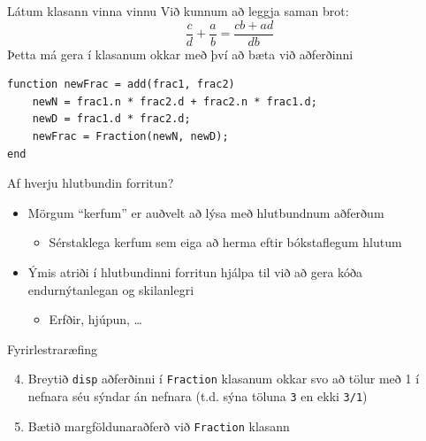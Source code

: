 \documentclass{beamer}
\begin{document}
\begin{frame}[fragile]{Látum klasann vinna vinnu}
\vspace{\baselineskip}
Við kunnum að leggja saman brot:
\[
\frac{c}{d} + \frac{a}{b} = \frac{cb+ad}{db} 
\]
Þetta má gera í klasanum okkar með því að bæta við aðferðinni
\begin{verbatim}
function newFrac = add(frac1, frac2)
    newN = frac1.n * frac2.d + frac2.n * frac1.d;
    newD = frac1.d * frac2.d;
    newFrac = Fraction(newN, newD);
end
\end{verbatim}
\end{frame}

\begin{frame}[fragile]{Af hverju hlutbundin forritun?}
\begin{itemize}
 \item Mörgum ``kerfum'' er auðvelt að lýsa með hlutbundnum aðferðum
 \begin{itemize}
  \item Sérstaklega kerfum sem eiga að herma eftir bókstaflegum hlutum
 \end{itemize}
 \item Ýmis atriði í hlutbundinni forritun hjálpa til við að gera kóða endurnýtanlegan og skilanlegri
 \begin{itemize}
  \item Erfðir, hjúpun, \ldots
 \end{itemize}
\end{itemize}
\end{frame}

\begin{frame}{Fyrirlestraræfing}
\begin{enumerate}
 \setcounter{enumi}{3}
 \item Breytið \texttt{disp} aðferðinni í \texttt{Fraction} klasanum okkar svo að tölur með 1 í nefnara séu sýndar án nefnara (t.d. sýna töluna \texttt{3} en ekki \texttt{3/1})
 \item Bætið margföldunaraðferð við \texttt{Fraction} klasann
\end{enumerate}

\end{frame}
\end{document}
